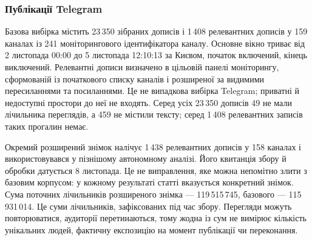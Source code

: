 \subsubsection{Публікації Telegram}

Базова вибірка містить 23\,350 зібраних дописів і 1\,408 релевантних дописів у 159 каналах із 241 моніторингового ідентифікатора каналу. Основне вікно триває від 2 листопада 00:00 до 5 листопада 12:10:13 за Києвом, початок включений, кінець виключений. Релевантні дописи визначено в цільовій панелі моніторингу, сформованій із початкового списку каналів і розширеної за видимими пересиланнями та посиланнями. Це не випадкова вибірка Telegram; приватні й недоступні простори до неї не входять. Серед усіх 23\,350 дописів 49 не мали лічильника переглядів, а 459 не містили тексту; серед 1\,408 релевантних записів таких прогалин немає.

Окремий розширений знімок налічує 1\,438 релевантних дописів у 158 каналах і використовувався у пізнішому автономному аналізі. Його квитанція збору й обробки датується 8 листопада. Це не виправлення, яке можна непомітно злити з базовим корпусом: у кожному результаті статті вказується конкретний знімок. Сума поточних лічильників розширеного знімка — 119\,515\,745, базового — 115\,931\,014. Це суми лічильників, зафіксованих під час збору. Перегляди можуть повторюватися, аудиторії перетинаються, тому жодна із сум не вимірює кількість унікальних людей, фактичну експозицію на момент публікації чи переконання.

